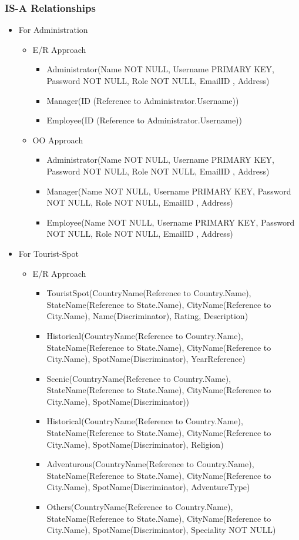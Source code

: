 \documentclass[11pt]{article}
\begin{document}
\subsubsection{IS-A Relationships}
\begin{itemize}
\item For Administration
\begin{itemize}
\item E/R Approach
\begin{itemize}
\item Administrator(Name NOT NULL, Username PRIMARY KEY, Password NOT NULL, Role NOT NULL, EmailID , Address)
\item Manager(ID (Reference to Administrator.Username))
\item Employee(ID (Reference to Administrator.Username))
\end{itemize}
\item OO Approach
\begin{itemize}
\item Administrator(Name NOT NULL, Username PRIMARY KEY, Password NOT NULL, Role NOT NULL, EmailID , Address)
\item Manager(Name NOT NULL, Username PRIMARY KEY, Password NOT NULL, Role NOT NULL, EmailID , Address)
\item Employee(Name NOT NULL, Username PRIMARY KEY, Password NOT NULL, Role NOT NULL, EmailID , Address)
\end{itemize}
\end{itemize} 
\item For Tourist-Spot
\begin{itemize}
\item E/R Approach
\begin{itemize}
\item TouristSpot(CountryName(Reference to Country.Name), StateName(Reference to State.Name), CityName(Reference to City.Name), Name(Discriminator), Rating, Description)

\item Historical(CountryName(Reference to Country.Name), StateName(Reference to State.Name), CityName(Reference to City.Name), SpotName(Discriminator), YearReference)
\item Scenic(CountryName(Reference to Country.Name), StateName(Reference to State.Name), CityName(Reference to City.Name), SpotName(Discriminator))
\item Historical(CountryName(Reference to Country.Name), StateName(Reference to State.Name), CityName(Reference to City.Name), SpotName(Discriminator), Religion)
\item Adventurous(CountryName(Reference to Country.Name), StateName(Reference to State.Name), CityName(Reference to City.Name), SpotName(Discriminator), AdventureType)
\item Others(CountryName(Reference to Country.Name), StateName(Reference to State.Name), CityName(Reference to City.Name), SpotName(Discriminator), Speciality NOT NULL)


\end{itemize}
\end{itemize}
\end{itemize}
\end{document}
